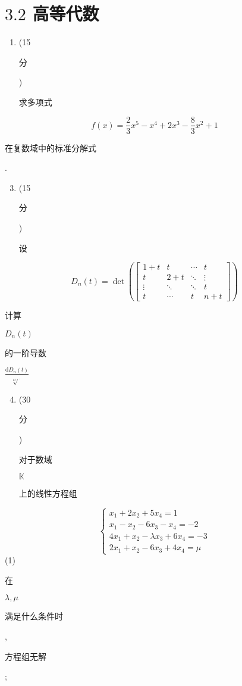 \documentclass[10pt]{article}
\begin{document}
\section{$3.2$ 高等代数}
\begin{enumerate}
  \item (15 \begin{CJK}{UTF8}{mj}分\end{CJK}) \begin{CJK}{UTF8}{mj}求多项式\end{CJK}
\end{enumerate}
$$
f(x)=\frac{2}{3} x^{5}-x^{4}+2 x^{3}-\frac{8}{3} x^{2}+1
$$
\begin{CJK}{UTF8}{mj}在复数域中的标准分解式\end{CJK}.

\begin{enumerate}
  \setcounter{enumi}{2}
  \item (15 \begin{CJK}{UTF8}{mj}分\end{CJK}) \begin{CJK}{UTF8}{mj}设\end{CJK}
\end{enumerate}
$$
D_{n}(t)=\operatorname{det}\left(\left[\begin{array}{cccc}
1+t & t & \cdots & t \\
t & 2+t & \ddots & \vdots \\
\vdots & \ddots & \ddots & t \\
t & \cdots & t & n+t
\end{array}\right]\right)
$$
\begin{CJK}{UTF8}{mj}计算\end{CJK} $D_{n}(t)$ \begin{CJK}{UTF8}{mj}的一阶导数\end{CJK} $\frac{\mathrm{d} D_{n}(t)}{\sqrt[\mathrm{d} t]{ } \text {. }}$

\begin{enumerate}
  \setcounter{enumi}{3}
  \item (30 \begin{CJK}{UTF8}{mj}分\end{CJK}) \begin{CJK}{UTF8}{mj}对于数域\end{CJK} $\mathbb{K}$ \begin{CJK}{UTF8}{mj}上的线性方程组\end{CJK}
\end{enumerate}
$$
\left\{\begin{array}{l}
x_{1}+2 x_{2}+5 x_{4}=1 \\
x_{1}-x_{2}-6 x_{3}-x_{4}=-2 \\
4 x_{1}+x_{2}-\lambda x_{3}+6 x_{4}=-3 \\
2 x_{1}+x_{2}-6 x_{3}+4 x_{4}=\mu
\end{array}\right.
$$
(1) \begin{CJK}{UTF8}{mj}在\end{CJK} $\lambda, \mu$ \begin{CJK}{UTF8}{mj}满足什么条件时\end{CJK}, \begin{CJK}{UTF8}{mj}方程组无解\end{CJK};
\end{document}
